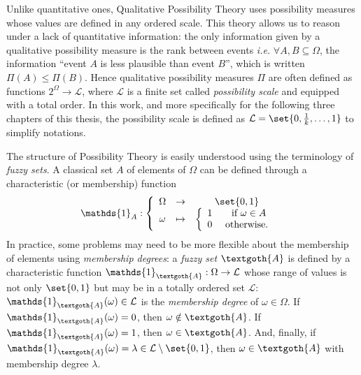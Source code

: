 Unlike quantitative ones, Qualitative Possibility Theory 
uses possibility measures whose values are defined in any ordered scale.
This theory allows us to reason under a lack of quantitative information:
the only information given by a qualitative possibility measure 
is the rank between events \textit{i.e.} $\forall A,B \subseteq \Omega$, 
the information ``event $A$ is less plausible than event $B$'', 
which is written $\Pi(A) \leqslant \Pi(B)$.
Hence qualitative possibility measures $\Pi$ are often defined
as functions $2^{\Omega} \rightarrow \mathcal{L}$,
where $\mathcal{L}$ is a finite set
called \textit{possibility scale} 
and equipped with a total order. 
In this work, and more specifically 
for the following three chapters of this thesis, 
the possibility scale is defined as $\mathcal{L} = \set{ 0, \frac{1}{k}, \ldots, 1 }$
to simplify notations.

The structure of Possibility Theory is easily understood 
using the terminology of \textit{fuzzy sets}.
A classical set $A$ of elements of $\Omega$ can be defined through
a characteristic (or membership) function \[ \mathds{1}_{A}: \left \{ \begin{array}{ccc} \Omega & \rightarrow & \set{0,1} \\ \omega & \mapsto & \left \{ \begin{array}{ccc} 1 & \mbox{ if } \omega \in A \\ 0 & \mbox{ otherwise. } \end{array} \right. \end{array} \right. \]
In practice, some problems
may need to be more flexible 
about the membership of elements using \textit{membership degrees}:
a \textit{fuzzy set} $\textgoth{A}$
is defined by a characteristic function $\mathds{1}_{\textgoth{A}}: \Omega \rightarrow \mathcal{L}$
whose range of values is not only $\set{0,1}$ 
but may be in a totally ordered set $\mathcal{L}$: 
$\mathds{1}_{\textgoth{A}}(\omega) \in \mathcal{L}$ 
is the \textit{membership degree} of $\omega \in \Omega$.
If $\mathds{1}_{\textgoth{A}}(\omega) = 0$, then $\omega \notin \textgoth{A}$.
If $\mathds{1}_{\textgoth{A}}(\omega) = 1$, then $\omega \in \textgoth{A}$.
And, finally, if $\mathds{1}_{\textgoth{A}}(\omega) = \lambda \in \mathcal{L} \setminus \set{0,1}$,
then $\omega \in \textgoth{A}$ with membership degree $\lambda$.

